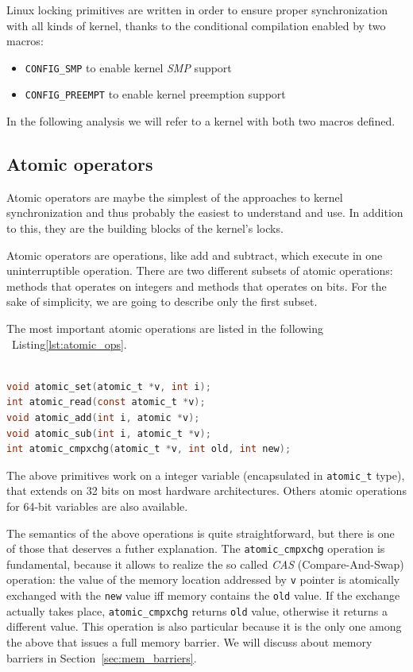 Linux locking primitives are written in order to ensure proper synchronization with all
kinds of kernel, thanks to the conditional compilation enabled by two macros:

\begin{itemize}
\item \texttt{CONFIG\_SMP} to enable kernel \emph{SMP} support
\item \texttt{CONFIG\_PREEMPT} to enable kernel preemption support
\end{itemize}

In the following analysis we will refer to a kernel with both two macros defined.

\subsection{Atomic operators\label{sec:atomic_ops}}
Atomic operators are maybe the simplest of the approaches to kernel synchronization
and thus probably the easiest to understand and use. In addition to this, they are the
building blocks of the kernel's locks.

Atomic operators are operations, like add and subtract, which execute in one uninterruptible
operation. There are two different subsets of atomic operations: methods that operates
on integers and methods that operates on bits. For the sake of simplicity, we are going to 
describe only the first subset.

The most important atomic operations are listed in the following ~Listing\ref{lst:atomic_ops}.

\begin{lstlisting}[language=C, caption={Atomic operations on integer},
			label={lst:atomic_ops}]

void atomic_set(atomic_t *v, int i);
int atomic_read(const atomic_t *v);
void atomic_add(int i, atomic *v);
void atomic_sub(int i, atomic_t *v);
int atomic_cmpxchg(atomic_t *v, int old, int new);

\end{lstlisting}

The above primitives work on a integer variable (encapsulated in \texttt{atomic\_t}
type), that extends on 32 bits on most hardware architectures. Others atomic 
operations for 64-bit variables are also available.

The semantics of the above operations is quite straightforward, but there is one of
those that deserves a futher explanation. The \texttt{atomic\_cmpxchg} operation is
fundamental, because it allows to realize the so called \emph{CAS} (Compare-And-Swap)
operation: the value of the memory location addressed by \texttt{v} pointer is atomically
exchanged with the \texttt{new} value iff memory contains the \texttt{old} value. 
If the exchange actually takes place, \texttt{atomic\_cmpxchg} returns \texttt{old}
value, otherwise it returns a different value. This operation is also particular because
it is the only one among the above that issues a full memory barrier. We will discuss
about memory barriers in Section~\ref{sec:mem_barriers}.

